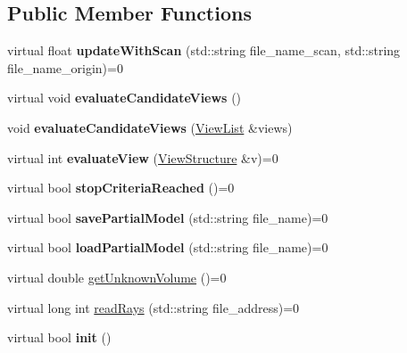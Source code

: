 \subsection*{Public Member Functions}
\begin{DoxyCompactItemize}
\item 
virtual float {\bfseries update\+With\+Scan} (std\+::string file\+\_\+name\+\_\+scan, std\+::string file\+\_\+name\+\_\+origin)=0\hypertarget{classPartialModelBase_a7071062d9a064fbc4bc62451db9390e3}{}\label{classPartialModelBase_a7071062d9a064fbc4bc62451db9390e3}

\item 
virtual void {\bfseries evaluate\+Candidate\+Views} ()\hypertarget{classPartialModelBase_ad7bc3e7e78b330b960de7ea36bc0dbff}{}\label{classPartialModelBase_ad7bc3e7e78b330b960de7ea36bc0dbff}

\item 
void {\bfseries evaluate\+Candidate\+Views} (\hyperlink{classViewList}{View\+List} \&views)\hypertarget{classPartialModelBase_a84680a7a9806e6816c29585a39109696}{}\label{classPartialModelBase_a84680a7a9806e6816c29585a39109696}

\item 
virtual int {\bfseries evaluate\+View} (\hyperlink{classViewStructure}{View\+Structure} \&v)=0\hypertarget{classPartialModelBase_a4f5c7099d776cefb4c67fc89613e5cac}{}\label{classPartialModelBase_a4f5c7099d776cefb4c67fc89613e5cac}

\item 
virtual bool {\bfseries stop\+Criteria\+Reached} ()=0\hypertarget{classPartialModelBase_aee7942b3450482f70d2b281ab26c6336}{}\label{classPartialModelBase_aee7942b3450482f70d2b281ab26c6336}

\item 
virtual bool {\bfseries save\+Partial\+Model} (std\+::string file\+\_\+name)=0\hypertarget{classPartialModelBase_a1586ba365b880e7e3241fba1168b58cd}{}\label{classPartialModelBase_a1586ba365b880e7e3241fba1168b58cd}

\item 
virtual bool {\bfseries load\+Partial\+Model} (std\+::string file\+\_\+name)=0\hypertarget{classPartialModelBase_a543970b4e4066f26be64b41f3c4738be}{}\label{classPartialModelBase_a543970b4e4066f26be64b41f3c4738be}

\item 
virtual double \hyperlink{classPartialModelBase_a3dc1ffa43084246c6a79b5763025dc73}{get\+Unknown\+Volume} ()=0
\item 
virtual long int \hyperlink{classPartialModelBase_a645f1e68e3e29419522c3ef10ee05d05}{read\+Rays} (std\+::string file\+\_\+address)=0
\item 
virtual bool {\bfseries init} ()\hypertarget{classPartialModelBase_a6c031ab6c30539668c840d440d5a5513}{}\label{classPartialModelBase_a6c031ab6c30539668c840d440d5a5513}


\end{DoxyCompactItemize}
